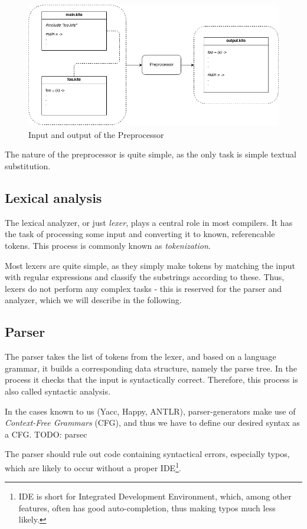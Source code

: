 \begin{figure}[H]
  \centering
  \includegraphics[scale=0.45]{images/preprocessor.png}
  \caption{Input and output of the Preprocessor}
\label{fig:preprocessor}
\end{figure}

The nature of the preprocessor is quite simple, as the only task is simple textual substitution.


\subsection{Lexical analysis}
The lexical analyzer, or just \emph{lexer}, plays a central role in most compilers. It has the task of processing some input and converting it to known, referencable tokens. This process is commonly known as \emph{tokenization}.

Most lexers are quite simple, as they simply make tokens by matching the input with regular expressions and classify the substrings according to these. Thus, lexers do not perform any complex tasks - this is reserved for the parser and analyzer, which we will describe in the following.


\subsection{Parser}
The parser takes the list of tokens from the lexer, and based on a language grammar, it builds a corresponding data structure, namely the parse tree. In the process it checks that the input is syntactically correct. Therefore, this process is also called syntactic analysis.

In the cases known to us (Yacc, Happy, ANTLR), parser-generators make use of \emph{Context-Free Grammars} (CFG), and thus we have to define our desired syntax as a CFG. TODO: parsec

The parser should rule out code containing syntactical errors, especially typos, which are likely to occur without a proper IDE\footnote{IDE is short for Integrated Development Environment, which, among other features, often has good auto-completion, thus making typos much less likely.}.


